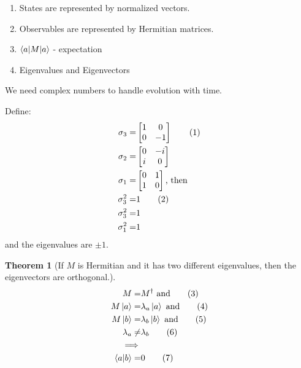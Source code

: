\documentclass[]{article}
\newcommand\numberthis{\addtocounter{equation}{1}\tag{\theequation}}
\newtheorem{thm}{Theorem}
\begin{document}
\begin{enumerate}
	\item States are represented by normalized vectors.
	\item Observables are represented by Hermitian matrices.
	\item $\braket{a|M|a}$ - expectation
	\item Eigenvalues and Eigenvectors
\end{enumerate}


We need complex numbers to handle evolution with time.

Define:
\begin{align*}
	\sigma_3 =& \begin{bmatrix} 1&0\\
	0&-1
                \end{bmatrix} \numberthis \label{eq:sigmas} \\
            \sigma_2 =& \begin{bmatrix}
            	0 & -i\\
            	i & 0
            \end{bmatrix}\\
     \sigma_1 =& \begin{bmatrix} 0&1\\
         	1&0
     \end{bmatrix} \text{, then}\\
	\sigma_3^2 =& 1 \numberthis \label{eq:sigma_sq}\\
	\sigma_3^2 =& 1\\
	\sigma_1^2 =& 1
\end{align*}
and the eigenvalues are $\pm1$.


\begin{thm}[If $M$ is Hermitian and it has two different eigenvalues, then the eigenvectors are orthogonal.]
	\begin{align*}
		M =& M^\dagger \text{ and} \numberthis \label{eq:hermitian}\\
		M \ket{a} =& \lambda_a \ket{a}\text{ and} \numberthis \label{eq:sigma_ev1}\\
		M \ket{b} =& \lambda_b \ket{b}\text{ and} \numberthis \label{eq:sigma_ev2}\\
		\lambda_a \ne& \lambda_b \numberthis \label{eq:ne} \\
		\implies&\\
		\braket{a \vert b} =& 0 \numberthis \label{eq:orthogonal}
	\end{align*}
\end{thm}
\end{document}
